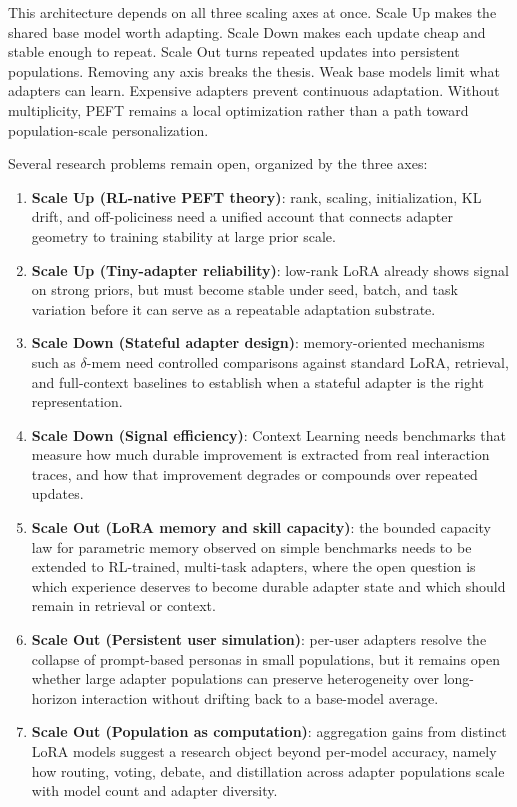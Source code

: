 \documentclass{llmxive}
\providecommand{\pony}[1]{#1}
\begin{document}
\pony{This architecture depends on all three scaling axes at once. Scale Up makes the shared base model worth adapting. Scale Down makes each update cheap and stable enough to repeat. Scale Out turns repeated updates into persistent populations. Removing any axis breaks the thesis. Weak base models limit what adapters can learn. Expensive adapters prevent continuous adaptation. Without multiplicity, PEFT remains a local optimization rather than a path toward population-scale personalization.}

\pony{Several research problems remain open, organized by the three axes:}

\begin{enumerate}
    \item \pony{\textbf{Scale Up (RL-native PEFT theory)}: rank, scaling, initialization, KL drift, and off-policiness need a unified account that connects adapter geometry to training stability at large prior scale.}
    \item \pony{\textbf{Scale Up (Tiny-adapter reliability)}: low-rank LoRA already shows signal on strong priors, but must become stable under seed, batch, and task variation before it can serve as a repeatable adaptation substrate.}
    \item \pony{\textbf{Scale Down (Stateful adapter design)}: memory-oriented mechanisms such as $\delta$-mem need controlled comparisons against standard LoRA, retrieval, and full-context baselines to establish when a stateful adapter is the right representation.}
    \item \pony{\textbf{Scale Down (Signal efficiency)}: Context Learning needs benchmarks that measure how much durable improvement is extracted from real interaction traces, and how that improvement degrades or compounds over repeated updates.}
    \item \pony{\textbf{Scale Out (LoRA memory and skill capacity)}: the bounded capacity law for parametric memory observed on simple benchmarks needs to be extended to RL-trained, multi-task adapters, where the open question is which experience deserves to become durable adapter state and which should remain in retrieval or context.}
    \item \pony{\textbf{Scale Out (Persistent user simulation)}: per-user adapters resolve the collapse of prompt-based personas in small populations, but it remains open whether large adapter populations can preserve heterogeneity over long-horizon interaction without drifting back to a base-model average.}
    \item \pony{\textbf{Scale Out (Population as computation)}: aggregation gains from distinct LoRA models suggest a research object beyond per-model accuracy, namely how routing, voting, debate, and distillation across adapter populations scale with model count and adapter diversity.}
\end{enumerate}
\end{document}
